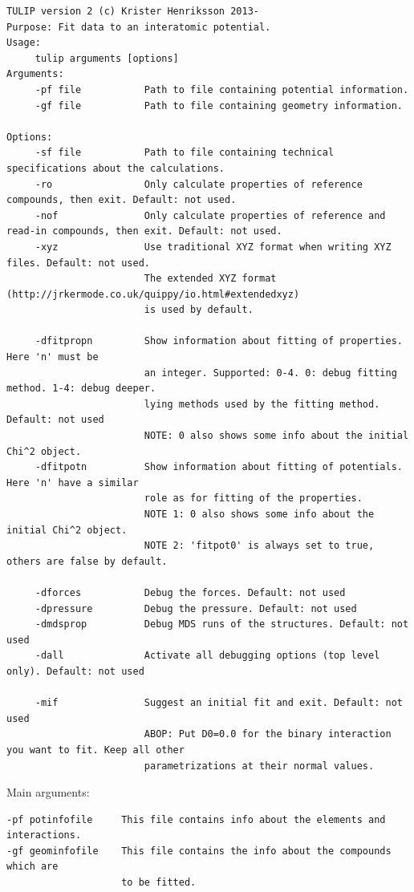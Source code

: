 \documentclass[a4paper,12pt,pdftex,onecolumn]{article}
\begin{document}
\begin{Verbatim}[fontsize=\relsize{-3},frame=single]
TULIP version 2 (c) Krister Henriksson 2013-
Purpose: Fit data to an interatomic potential.
Usage:
     tulip arguments [options]
Arguments:
     -pf file           Path to file containing potential information.
     -gf file           Path to file containing geometry information.

Options:
     -sf file           Path to file containing technical specifications about the calculations.
     -ro                Only calculate properties of reference compounds, then exit. Default: not used.
     -nof               Only calculate properties of reference and read-in compounds, then exit. Default: not used.
     -xyz               Use traditional XYZ format when writing XYZ files. Default: not used.
                        The extended XYZ format (http://jrkermode.co.uk/quippy/io.html#extendedxyz)
                        is used by default.

     -dfitpropn         Show information about fitting of properties. Here 'n' must be
                        an integer. Supported: 0-4. 0: debug fitting method. 1-4: debug deeper.
                        lying methods used by the fitting method. Default: not used
                        NOTE: 0 also shows some info about the initial Chi^2 object.
     -dfitpotn          Show information about fitting of potentials. Here 'n' have a similar
                        role as for fitting of the properties.
                        NOTE 1: 0 also shows some info about the initial Chi^2 object.
                        NOTE 2: 'fitpot0' is always set to true, others are false by default.

     -dforces           Debug the forces. Default: not used
     -dpressure         Debug the pressure. Default: not used
     -dmdsprop          Debug MDS runs of the structures. Default: not used
     -dall              Activate all debugging options (top level only). Default: not used

     -mif               Suggest an initial fit and exit. Default: not used
                        ABOP: Put D0=0.0 for the binary interaction you want to fit. Keep all other
                        parametrizations at their normal values.
\end{Verbatim}


Main arguments:

\begin{Verbatim}[fontsize=\relsize{-1},frame=single]
-pf potinfofile     This file contains info about the elements and interactions.
-gf geominfofile    This file contains the info about the compounds which are
                    to be fitted.
\end{Verbatim}
\end{document}
